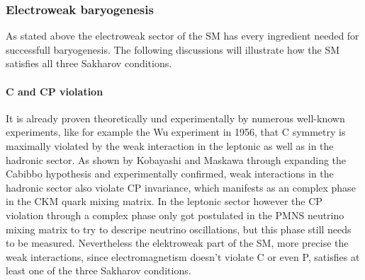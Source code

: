 \subsubsection{Electroweak baryogenesis}
As stated above the electroweak sector of the SM has every ingredient needed for successfull baryogenesis. The following discussions will illustrate how the SM satisfies all three Sakharov conditions.
\paragraph{C and CP violation}
It is already proven theoretically und experimentally by numerous well-known experiments, like for example the Wu experiment in 1956, that C symmetry is maximally violated by the weak interaction in the leptonic as well as in the hadronic sector. As shown by Kobayashi and Maskawa through expanding the Cabibbo hypothesis and experimentally confirmed, weak interactions in the hadronic sector also violate CP invariance, which manifests as an complex phase in the CKM quark mixing matrix. In the leptonic sector however the CP violation through a complex phase only got postulated in the PMNS neutrino mixing matrix to try to descripe neutrino oscillations, but this phase still needs to be measured.\newline
Nevertheless the elektroweak part of the SM, more precise the weak interactions, since electromagnetism doesn't violate C or even P, satisfies at least one of the three Sakharov conditions.\newline
